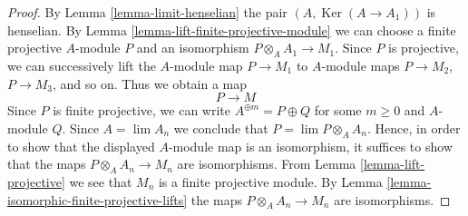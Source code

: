 \documentclass[10pt,a4paper]{amsart}
\theoremstyle{plain}
\theoremstyle{definition}
\theoremstyle{remark}
\numberwithin{equation}{subsection}
\def\lim{\mathop{\mathrm{lim}}\nolimits}
\def\Ker{\mathop{\mathrm{Ker}}}
\begin{document}
\begin{proof}
By Lemma \ref{lemma-limit-henselian} the pair $(A, \Ker(A \to A_1))$ is
henselian. By Lemma \ref{lemma-lift-finite-projective-module}
we can choose a finite projective $A$-module $P$ and an isomorphism
$P \otimes_A A_1 \to M_1$. Since $P$ is projective, we can successively lift
the $A$-module map $P \to M_1$ to $A$-module maps
$P \to M_2$, $P \to M_3$, and so on. Thus we obtain a map
$$
P \longrightarrow M
$$
Since $P$ is finite projective, we can write $A^{\oplus m} = P \oplus Q$
for some $m \geq 0$ and $A$-module $Q$. Since $A = \lim A_n$ we conclude
that $P = \lim P \otimes_A A_n$. Hence, in order to show that the displayed
$A$-module map is an isomorphism, it suffices to show that the maps
$P \otimes_A A_n \to M_n$ are isomorphisms.
From Lemma \ref{lemma-lift-projective} we see that
$M_n$ is a finite projective module.
By Lemma \ref{lemma-isomorphic-finite-projective-lifts}
the maps $P \otimes_A A_n \to M_n$ are isomorphisms.
\end{proof}
\end{document}
